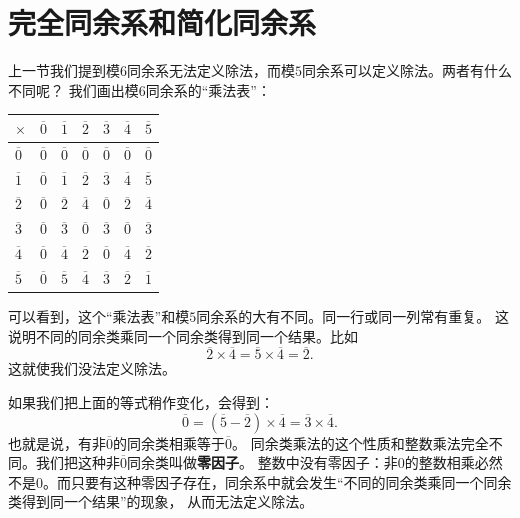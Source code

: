 \documentclass[12pt,UTF8,fontset=none]{ctexbook}
\begin{document}
\section{完全同余系和简化同余系}
上一节我们提到模$6$同余系无法定义除法，而模$5$同余系可以定义除法。两者有什么不同呢？
我们画出模$6$同余系的“乘法表”：
\begin{center}
    \begin{tabular}{ | p{2em}<{\centering} | p{2em}<{\centering} | p{2em}<{\centering} | p{2em}<{\centering} | p{2em}<{\centering} | p{2em}<{\centering} | p{2em}<{\centering} | }
        \hline
            $\times$   & $\overline{0}$ & $\overline{1}$ & $\overline{2}$ & $\overline{3}$ & $\overline{4}$ & $\overline{5}$ \\ [0.5ex] 
        \hline
        $\overline{0}$ & $\overline{0}$ & $\overline{0}$ & $\overline{0}$ & $\overline{0}$ & $\overline{0}$ & $\overline{0}$ \\  
        \hline
        $\overline{1}$ & $\overline{0}$ & $\overline{1}$ & $\overline{2}$ & $\overline{3}$ & $\overline{4}$ & $\overline{5}$ \\
        \hline
        $\overline{2}$ & $\overline{0}$ & $\overline{2}$ & $\overline{4}$ & $\overline{0}$ & $\overline{2}$ & $\overline{4}$ \\
        \hline
        $\overline{3}$ & $\overline{0}$ & $\overline{3}$ & $\overline{0}$ & $\overline{3}$ & $\overline{0}$ & $\overline{3}$ \\
        \hline 
        $\overline{4}$ & $\overline{0}$ & $\overline{4}$ & $\overline{2}$ & $\overline{0}$ & $\overline{4}$ & $\overline{2}$ \\
        \hline
        $\overline{5}$ & $\overline{0}$ & $\overline{5}$ & $\overline{4}$ & $\overline{3}$ & $\overline{2}$ & $\overline{1}$ \\
        \hline
    \end{tabular}
\end{center}
可以看到，这个“乘法表”和模$5$同余系的大有不同。同一行或同一列常有重复。
这说明不同的同余类乘同一个同余类得到同一个结果。比如
$$\overline{2}\times \overline{4} = \overline{5}\times \overline{4} = \overline{2}. $$
这就使我们没法定义除法。

如果我们把上面的等式稍作变化，会得到：
$$\overline{0} = (\overline{5} - \overline{2})\times \overline{4} = \overline{3} \times \overline{4}.$$
也就是说，有非$\overline{0}$的同余类相乘等于$\overline{0}$。
同余类乘法的这个性质和整数乘法完全不同。我们把这种非$\overline{0}$同余类叫做\textbf{零因子}。
整数中没有零因子：非$0$的整数相乘必然不是$0$。而只要有这种零因子存在，同余系中就会发生“不同的同余类乘同一个同余类得到同一个结果”的现象，
从而无法定义除法。
\end{document}
